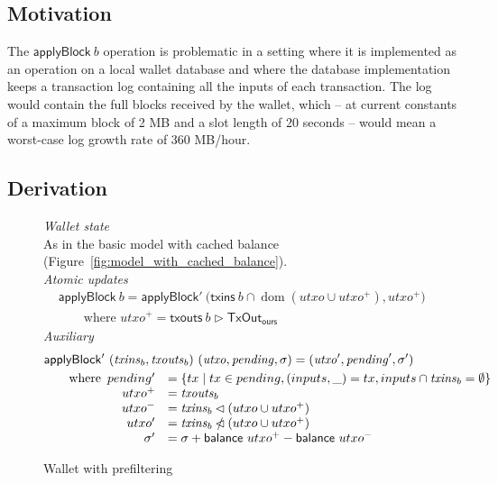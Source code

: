 \documentclass{article}
\newcommand{\restrictdom}{\lhd}
\newcommand{\subtractdom}{\mathbin{\slashed{\restrictdom}}}
\newcommand{\restrictrange}{\rhd}
\DeclareMathOperator{\dom}{dom}
\numberwithin{equation}{lemma}
\begin{document}
\subsection{Motivation}

The $\mathsf{applyBlock} ~ b$ operation is problematic in a setting where it is
implemented as an operation on a local wallet database and where the database
implementation keeps a transaction log containing all the inputs of each
transaction. The log would contain the full blocks received
by the wallet, which -- at current constants of a maximum block of 2 MB and a slot
length of 20 seconds -- would mean a worst-case log growth rate of 360 MB/hour.

\subsection{Derivation}

\begin{figure}[p]
%
\emph{Wallet state} \\

As in the basic model with cached balance (Figure~\ref{fig:model_with_cached_balance}).  \\

\emph{Atomic updates}
%
\begin{align*}
& \mathsf{applyBlock} ~ b
  = \mathsf{applyBlock}' ~ \Big( \mathsf{txins} ~ b \cap \dom (\mathit{utxo} \cup \mathit{utxo}^+), \mathit{utxo}^+ \Bigr) \\
& \qquad \text{where~} \mathit{utxo}^+ = \mathsf{txouts} ~ b \restrictrange \mathsf{TxOut_{ours}}
\end{align*}
%
\emph{Auxiliary}
%
\begin{align*}
& \mathsf{applyBlock'} ~ (\mathit{txins}_b, \mathit{txouts}_b) ~ (\mathit{utxo}, \mathit{pending}, \sigma) = (\mathit{utxo}^\prime, \mathit{pending}^\prime, \sigma^\prime) \\
& \qquad \text{where}
   \begin{array}[t]{rl}
     pending^\prime & = \{ tx \mid tx \in pending, (inputs, \_) = tx, inputs \cap \mathit{txins}_b = \emptyset \} \\
     utxo^+ & = \mathit{txouts}_b \\
     utxo^- & = \mathit{txins}_b \restrictdom (utxo \cup utxo^+) \\
     utxo^\prime & = \mathit{txins}_b \subtractdom (utxo \cup utxo^+) \\
     \sigma^\prime & = \sigma + \mathsf{balance} ~ utxo^+ - \mathsf{balance} ~ utxo^-
   \end{array}
\end{align*}

\caption{\label{fig:wallet_with_prefiltering}Wallet with prefiltering}
\end{figure}
\end{document}
